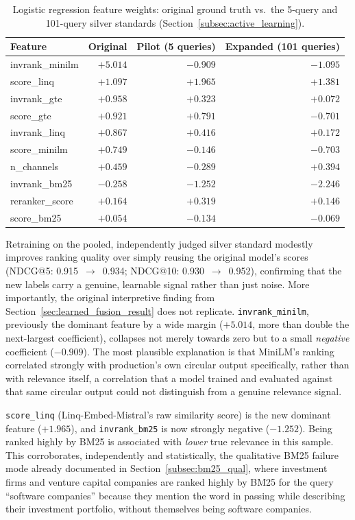 \documentclass[a4paper,oneside,bibliography=totoc]{scrbook}
\begin{document}
\begin{table}[ht]
\centering
\caption{Logistic regression feature weights: original ground truth vs.\ the 5-query and 101-query silver standards (Section~\ref{subsec:active_learning}).}
\label{tab:pooled_weights}
\small
\setlength{\tabcolsep}{6pt}
\begin{tabular}{lrrr}
\toprule
\textbf{Feature} & \textbf{Original} & \textbf{Pilot (5 queries)} & \textbf{Expanded (101 queries)} \\
\midrule
invrank\_minilm  & $+5.014$ & $-0.909$ & $-1.095$ \\
score\_linq      & $+1.097$ & $+1.965$ & $+1.381$ \\
invrank\_gte     & $+0.958$ & $+0.323$ & $+0.072$ \\
score\_gte       & $+0.921$ & $+0.791$ & $-0.701$ \\
invrank\_linq    & $+0.867$ & $+0.416$ & $+0.172$ \\
score\_minilm    & $+0.749$ & $-0.146$ & $-0.703$ \\
n\_channels      & $+0.459$ & $-0.289$ & $+0.394$ \\
invrank\_bm25    & $-0.258$ & $-1.252$ & $-2.246$ \\
reranker\_score  & $+0.164$ & $+0.319$ & $+0.146$ \\
score\_bm25      & $+0.054$ & $-0.134$ & $-0.069$ \\
\bottomrule
\end{tabular}
\end{table}

Retraining on the pooled, independently judged silver standard modestly improves ranking quality over simply reusing the original model's scores (NDCG@5: 0.915~$\to$~0.934; NDCG@10: 0.930~$\to$~0.952), confirming that the new labels carry a genuine, learnable signal rather than just noise. More importantly, the original interpretive finding from Section~\ref{sec:learned_fusion_result} does not replicate. \texttt{invrank\_minilm}, previously the dominant feature by a wide margin ($+5.014$, more than double the next-largest coefficient), collapses not merely towards zero but to a small \emph{negative} coefficient ($-0.909$). The most plausible explanation is that MiniLM's ranking correlated strongly with production's own circular output specifically, rather than with relevance itself, a correlation that a model trained and evaluated against that same circular output could not distinguish from a genuine relevance signal.

\texttt{score\_linq} (Linq-Embed-Mistral's raw similarity score) is the new dominant feature ($+1.965$), and \texttt{invrank\_bm25} is now strongly negative ($-1.252$). Being ranked highly by BM25 is associated with \emph{lower} true relevance in this sample. This corroborates, independently and statistically, the qualitative BM25 failure mode already documented in Section~\ref{subsec:bm25_qual}, where investment firms and venture capital companies are ranked highly by BM25 for the query ``software companies'' because they mention the word in passing while describing their investment portfolio, without themselves being software companies.
\end{document}
